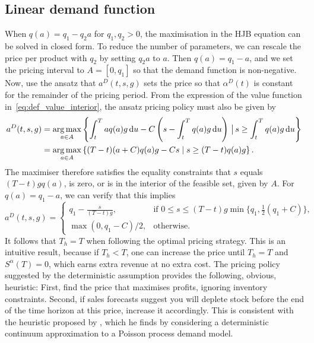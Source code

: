 \documentclass[main.tex]{subfiles}
\begin{document}
\subsection{Linear demand function}
When $q(a)=q_1-q_2a$ for $q_1,q_2>0$, the maximisation in the HJB
equation can be solved in closed form.
To reduce the number of parameters, we can rescale the price per
product with $q_2$ by setting $q_2a$ to $a$.
Then $q(a)=q_1-a$, and we set the pricing interval to $A=[0,q_1]$ so that the demand
function is non-negative.
Now, use the ansatz that $a^D(t,s,g)$ sets the price so that
$\alpha^D(t)$ is
constant for the remainder of the pricing period.
From the expression of the value function
in~\eqref{eq:def_value_interior}, the ansatz pricing policy must
also be given by
\begin{align}
  a^D(t,s,g)
  &=\operatorname*{arg\,max}_{a\in A}\left\{\int_t^Taq(a)g\,\mathrm{d}u -
    C\left(s-\int_t^Tq(a)g\,\mathrm{d}u\right) \,\big|\,  s \geq \int_t^Tq(a)g\,\mathrm{d}u\right\}\\
  &=\operatorname*{arg\,max}_{a\in A}\left\{(T-t)(a+C)q(a)g-Cs \mid  s \geq
    (T-t)q(a)g\right\}.
\end{align}
The maximiser therefore satisfies the equality constraints that
$s$ equals $(T-t)gq(a)$, is zero, or is in the interior of the feasible set,
given by $A$.
For $q(a)=q_1-a$, we can verify that this implies
\begin{equation}\label{eq:astar_linear}
  a^D(t,s,g)=\begin{cases}
    q_1-\frac{s}{(T-t)g}, &\text{if } 0\leq s\leq
    (T-t)g\min\{q_1,\frac{1}{2}(q_1 +C)\},\\
    \max(0,q_1-C)/2,&\text{otherwise.}
  \end{cases}
\end{equation}
It follows that $T_h=T$ when following the optimal pricing strategy.
This is an intuitive result, because if $T_h<T$, one can increase the
price until $T_h=T$ and $S^\alpha(T)=0$, which earns extra revenue at no extra cost.
The pricing policy suggested by the
deterministic assumption provides the following, obvious, heuristic:
First, find the price that maximises profits, ignoring inventory
constraints. Second, if sales forecasts suggest you will deplete stock
before the end of the time horizon at this price, increase it
accordingly. This is consistent with the heuristic proposed
by \citet{schlosser2015dynamic1,schlosser2015dynamic2}, which
he finds by considering a deterministic continuum
approximation to a Poisson process demand model.
\end{document}
